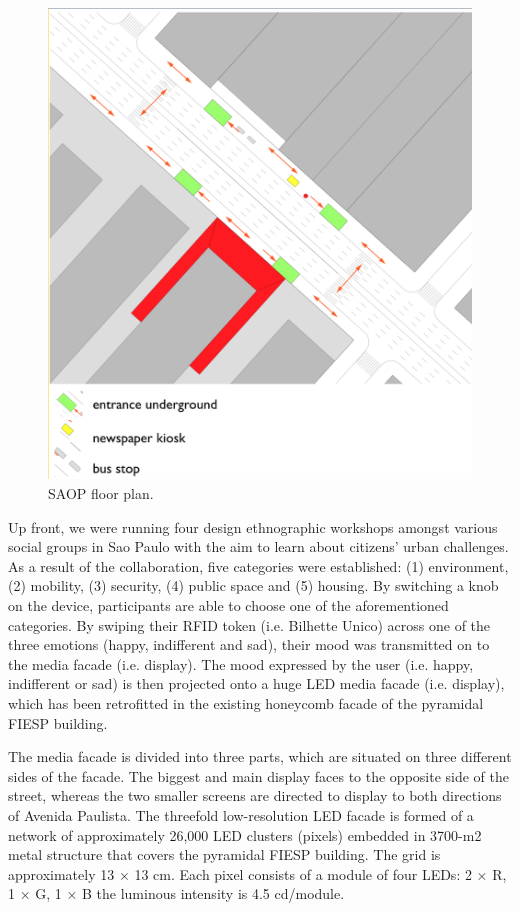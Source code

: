 \begin{figure}[!h] 
\centering
\includegraphics[width=\textwidth]{Illustrations/SAOPfloorplan.png}
\caption [SAOP floor plan] {SAOP floor plan.}
\label{SAOPfloorplan}
\end{figure}

Up front, we were running four design ethnographic workshops amongst various social groups in Sao Paulo with the aim to learn about citizens’ urban challenges. 
As a result of the collaboration, five categories were established: (1) environment, (2) mobility, (3) security, (4) public space and (5) housing.
By switching a knob on the device, participants are able to choose one of the aforementioned categories. By swiping their RFID token (i.e. Bilhette Unico) across one of the three emotions (happy, indifferent and sad), their mood was transmitted on to the media facade (i.e. display).
The mood expressed by the user (i.e. happy, indifferent or sad) is then projected onto a huge LED media facade (i.e. display), which has been retrofitted in the existing honeycomb facade of the pyramidal FIESP building.


The media facade is divided into three parts, which are situated on three different sides of the facade. The biggest and main display faces to the opposite side of the street, whereas the two smaller screens are directed to display to both directions of Avenida Paulista. 
The threefold low-resolution LED facade is formed of a network of approximately 26,000 LED clusters (pixels) embedded in 3700-m2 metal structure that covers the pyramidal FIESP building. 
The grid is approximately 13 × 13 cm. Each pixel consists of a module of four LEDs: 2 × R, 1 × G, 1 × B the luminous intensity is 4.5 cd/module.
 

